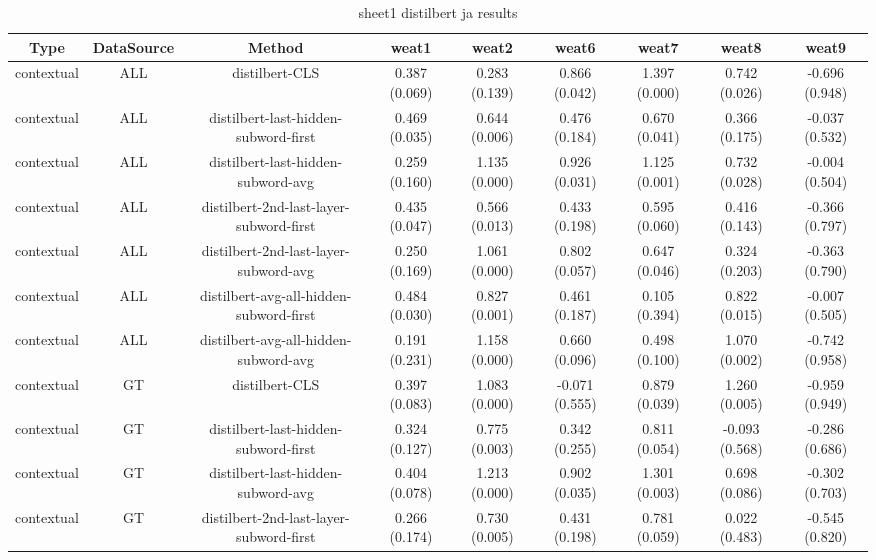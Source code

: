 \begin{sidewaystable}[htb]
    \centering
    \caption{sheet1 distilbert ja results}
    \label{appendix_tab:sheet1_distilbert_ja_results}
    \small
    \begin{tabular}{@{}ccccccccc@{}}
        \toprule
        Type & DataSource & Method & weat1 & weat2 & weat6 & weat7 & weat8 & weat9 \\
        \midrule
        contextual & ALL & distilbert-CLS & 0.387 (0.069) & 0.283 (0.139) & 0.866 (0.042) & 1.397 (0.000) & 0.742 (0.026) & -0.696 (0.948) \\
        contextual & ALL & distilbert-last-hidden-subword-first & 0.469 (0.035) & 0.644 (0.006) & 0.476 (0.184) & 0.670 (0.041) & 0.366 (0.175) & -0.037 (0.532) \\
        contextual & ALL & distilbert-last-hidden-subword-avg & 0.259 (0.160) & 1.135 (0.000) & 0.926 (0.031) & 1.125 (0.001) & 0.732 (0.028) & -0.004 (0.504) \\
        contextual & ALL & distilbert-2nd-last-layer-subword-first & 0.435 (0.047) & 0.566 (0.013) & 0.433 (0.198) & 0.595 (0.060) & 0.416 (0.143) & -0.366 (0.797) \\
        contextual & ALL & distilbert-2nd-last-layer-subword-avg & 0.250 (0.169) & 1.061 (0.000) & 0.802 (0.057) & 0.647 (0.046) & 0.324 (0.203) & -0.363 (0.790) \\
        contextual & ALL & distilbert-avg-all-hidden-subword-first & 0.484 (0.030) & 0.827 (0.001) & 0.461 (0.187) & 0.105 (0.394) & 0.822 (0.015) & -0.007 (0.505) \\
        contextual & ALL & distilbert-avg-all-hidden-subword-avg & 0.191 (0.231) & 1.158 (0.000) & 0.660 (0.096) & 0.498 (0.100) & 1.070 (0.002) & -0.742 (0.958) \\
        contextual & GT & distilbert-CLS & 0.397 (0.083) & 1.083 (0.000) & -0.071 (0.555) & 0.879 (0.039) & 1.260 (0.005) & -0.959 (0.949) \\
        contextual & GT & distilbert-last-hidden-subword-first & 0.324 (0.127) & 0.775 (0.003) & 0.342 (0.255) & 0.811 (0.054) & -0.093 (0.568) & -0.286 (0.686) \\
        contextual & GT & distilbert-last-hidden-subword-avg & 0.404 (0.078) & 1.213 (0.000) & 0.902 (0.035) & 1.301 (0.003) & 0.698 (0.086) & -0.302 (0.703) \\
        contextual & GT & distilbert-2nd-last-layer-subword-first & 0.266 (0.174) & 0.730 (0.005) & 0.431 (0.198) & 0.781 (0.059) & 0.022 (0.483) & -0.545 (0.820) \\

\end{tabular}
\end{sidewaystable}
